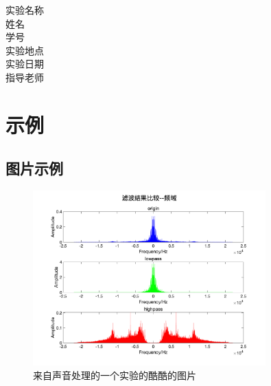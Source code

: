 \documentclass{article}
\begin{document}
\begin{titlepage}
	\vspace*{1cm}
    \begin{center}
            \Large 实验名称\ \ \underline{} \\ 
            \vspace{0.3cm}
            \quad \Large 姓名 \ \quad \underline{} \\ 
            \vspace{0.3cm}
            \quad \Large 学号\ \quad \underline{}\\
            \vspace{0.3cm}
            \Large 实验地点\ \ \underline{}\\
            \vspace{0.3cm}
            \Large 实验日期\ \ \underline{}\\
            \vspace{0.3cm}
            \Large 指导老师\ \ \underline{}\\
            

             
    \end{center}
        
    
\end{titlepage}

\newpage

\thispagestyle{empty} %

\tableofcontents %
\listoffigures%
\listoftables%
\thispagestyle{empty} 

\newpage
{}%


\section{示例}
\subsection{图片示例}
\begin{figure}[H]
\centering
\includegraphics[width=0.8\textwidth]{filter-result-frequency}
\caption{来自声音处理的一个实验的酷酷的图片}
\end{figure}
\end{document}
